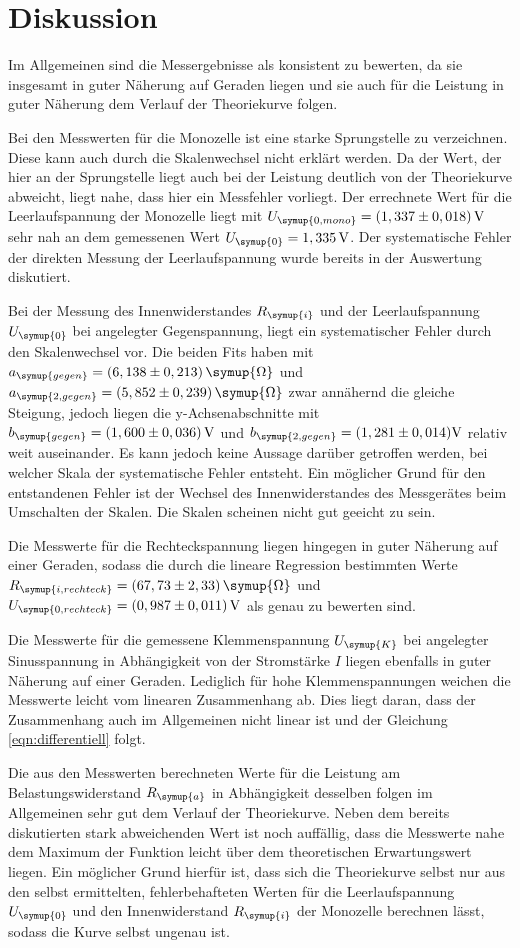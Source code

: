 \section{Diskussion}
\label{sec:Diskussion}

Im Allgemeinen sind die Messergebnisse als konsistent zu bewerten, da sie
insgesamt in guter Näherung auf Geraden liegen und sie auch für die
Leistung in guter Näherung dem Verlauf der Theoriekurve folgen.

Bei den Messwerten für die Monozelle ist eine starke Sprungstelle zu verzeichnen.
Diese kann auch durch die Skalenwechsel nicht erklärt werden. Da der Wert, der
hier an der Sprungstelle liegt auch bei der Leistung deutlich von der
Theoriekurve abweicht, liegt nahe, dass hier ein Messfehler vorliegt. Der errechnete
Wert für die Leerlaufspannung der Monozelle liegt mit
$U_{\symup{0,mono}}=(1,337\pm0,018)\,\text{V}$ sehr nah an dem gemessenen
Wert $U_{\symup{0}}=1,335\,\text{V}$. Der systematische Fehler der direkten
Messung der Leerlaufspannung wurde bereits in der Auswertung diskutiert.

Bei der Messung des Innenwiderstandes $R_{\symup{i}}$ und der Leerlaufspannung
$U_{\symup{0}}$ bei angelegter Gegenspannung, liegt ein systematischer Fehler durch
den Skalenwechsel vor. Die beiden Fits haben mit
$a_{\symup{gegen}}=(6,138\pm0,213)\,\symup{\Omega}$ und
$a_{\symup{2,gegen}}=(5,852\pm0,239)\,\symup{\Omega}$ zwar annähernd
die gleiche Steigung, jedoch liegen die y-Achsenabschnitte mit
$b_{\symup{gegen}}=(1,600\pm0,036)\,\text{V}$ und
$b_{\symup{2,gegen}}=(1,281\pm0,014)\text{V}$
relativ weit auseinander. Es kann jedoch keine Aussage darüber getroffen werden,
bei welcher Skala der systematische Fehler entsteht. Ein möglicher Grund für den
entstandenen Fehler ist der Wechsel des Innenwiderstandes des Messgerätes beim
Umschalten der Skalen. Die Skalen scheinen nicht gut geeicht zu sein.

Die Messwerte für die Rechteckspannung liegen hingegen in guter Näherung auf einer Geraden,
sodass die durch die lineare Regression bestimmten Werte
$R_{\symup{i,rechteck}}=(67,73\pm2,33)\,\symup{\Omega}$ und
$U_{\symup{0,rechteck}}=(0,987\pm0,011)\,\text{V}$ als genau zu bewerten sind.

Die Messwerte für die gemessene Klemmenspannung $U_{\symup{K}}$ bei angelegter
Sinusspannung in Abhängigkeit von der Stromstärke $I$ liegen ebenfalls in guter Näherung auf
einer Geraden. Lediglich für hohe Klemmenspannungen weichen die Messwerte leicht
vom linearen Zusammenhang ab. Dies liegt daran, dass der Zusammenhang auch im Allgemeinen
nicht linear ist und der Gleichung \eqref{eqn:differentiell} folgt.

Die aus den Messwerten berechneten Werte für die Leistung am Belastungswiderstand
$R_{\symup{a}}$ in Abhängigkeit desselben folgen im Allgemeinen sehr gut dem Verlauf
der Theoriekurve. Neben dem bereits diskutierten stark abweichenden Wert ist noch
auffällig, dass die Messwerte nahe dem Maximum der Funktion leicht über dem theoretischen
Erwartungswert liegen. Ein möglicher Grund hierfür ist, dass sich die Theoriekurve selbst
nur aus den selbst ermittelten, fehlerbehafteten Werten für die Leerlaufspannung
$U_{\symup{0}}$ und den Innenwiderstand $R_{\symup{i}}$ der Monozelle
berechnen lässt, sodass die Kurve selbst ungenau ist.
